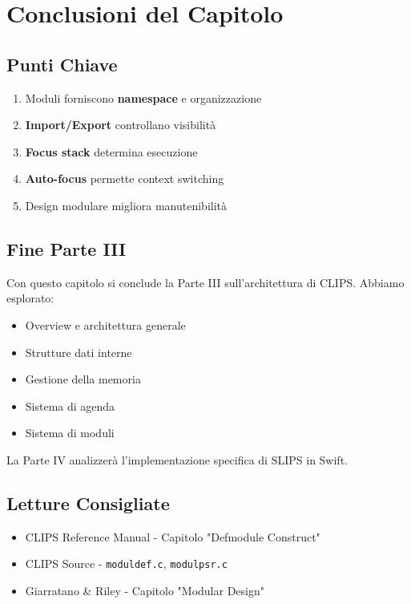 \section{Conclusioni del Capitolo}

\subsection{Punti Chiave}

\begin{enumerate}
\item Moduli forniscono \textbf{namespace} e organizzazione
\item \textbf{Import/Export} controllano visibilità
\item \textbf{Focus stack} determina esecuzione
\item \textbf{Auto-focus} permette context switching
\item Design modulare migliora manutenibilità
\end{enumerate}

\subsection{Fine Parte III}

Con questo capitolo si conclude la Parte III sull'architettura di CLIPS. Abbiamo esplorato:
\begin{itemize}
\item Overview e architettura generale
\item Strutture dati interne
\item Gestione della memoria
\item Sistema di agenda
\item Sistema di moduli
\end{itemize}

La Parte IV analizzerà l'implementazione specifica di SLIPS in Swift.

\subsection{Letture Consigliate}

\begin{itemize}
\item CLIPS Reference Manual - Capitolo "Defmodule Construct"
\item CLIPS Source - \texttt{moduldef.c}, \texttt{modulpsr.c}
\item Giarratano \& Riley - Capitolo "Modular Design"
\end{itemize}
